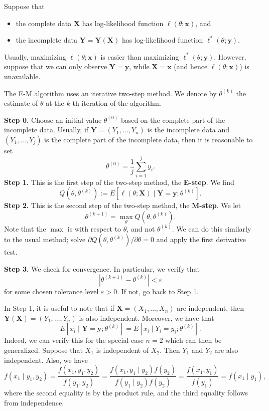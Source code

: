 \documentclass[10pt]{article}
\theoremstyle{newstyle}
\begin{document}
Suppose that 
\begin{itemize}
    \item the complete data $\mathbf X$ has log-likelihood function $\ell(\theta; \mathbf x)$, and 
    \item the incomplete data $\mathbf Y = \mathbf Y(\mathbf X)$ has log-likelihood function 
    $\ell^*(\theta; \mathbf y)$. 
\end{itemize}
Usually, maximizing $\ell(\theta; \mathbf x)$ is easier than maximizing $\ell^*(\theta; \mathbf y)$. 
However, suppose that we can only observe $\mathbf Y = \mathbf y$, while 
$\mathbf X = \mathbf x$ (and hence $\ell(\theta; \mathbf x)$) is unavailable. 

The E-M algorithm uses an iterative two-step method. We denote by $\theta^{(k)}$ the 
estimate of $\theta$ at the $k$-th iteration of the algorithm. 

{\bf Step 0.} Choose an initial value $\theta^{(0)}$ based on the complete part of the incomplete 
data. Usually, if $\mathbf Y = (Y_1, \dots, Y_n)$ is the incomplete data and 
$(Y_1, \dots, Y_j)$ is the complete part of the incomplete data, 
then it is reasonable to set 
\[ \theta^{(0)} = \frac{1}{j} \sum_{i=1}^j y_i. \]
{\bf Step 1.} This is the first step of the two-step method, the {\bf E-step}. We find 
\[ Q(\theta, \theta^{(k)}) := E[\ell(\theta; \mathbf X) \mid \mathbf Y = \mathbf y; \theta^{(k)}]. \]
{\bf Step 2.} This is the second step of the two-step method, the {\bf M-step}. We let 
\[ \theta^{(k+1)} = \max_\theta Q(\theta, \theta^{(k)}). \]
Note that the $\max$ is with respect to $\theta$, and not $\theta^{(k)}$. We can 
do this similarly to the usual method; solve $\partial Q(\theta, \theta^{(k)})/\partial\theta = 0$
and apply the first derivative test. 

{\bf Step 3.} We check for convergence. In particular, we verify that 
\[ |\theta^{(k+1)} - \theta^{(k)}| < \varepsilon \]
for some chosen tolerance level $\varepsilon > 0$. If not, go back to Step 1. 

In Step 1, it is useful to note that if $\mathbf X = (X_1, \dots, X_n)$ are independent, then  
$\mathbf Y(\mathbf X) = (Y_1, \dots, Y_n)$ is also independent. Moreover, we have that 
\[ E[x_i \mid \mathbf Y = \mathbf y; \theta^{(k)}] = E[x_i \mid Y_i = y_i; \theta^{(k)}]. \]
Indeed, we can verify this for the special case $n = 2$ which can then be generalized. 
Suppose that $X_1$ is independent of $X_2$. Then $Y_1$ and $Y_2$ are also 
independent. Also, we have 
\[ f(x_1 \mid y_1, y_2) = \frac{f(x_1, y_1, y_2)}{f(y_1, y_2)} = 
\frac{f(x_1, y_1 \mid y_2)f(y_2)}{f(y_1 \mid y_2)f(y_2)} = \frac{f(x_1, y_1)}{f(y_1)} = f(x_1 \mid y_1), \]
where the second equality is by the product rule, and the third equality follows from independence. 
\end{document}
